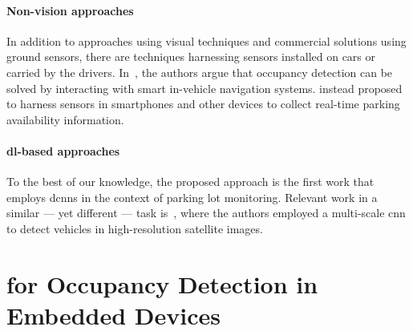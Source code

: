 \paragraph{Non-vision approaches}
In addition to approaches using visual techniques and commercial solutions using ground sensors, there are techniques harnessing sensors installed on cars or carried by the drivers.
In~\cite{caicedo2012prediction}, the authors argue that occupancy detection can be solved by interacting with smart in-vehicle navigation systems.
\citet{lan2014intelligent} instead proposed to harness sensors in smartphones and other devices to collect real-time parking availability information.
%
\paragraph{\gls{dl}-based approaches}
To the best of our knowledge, the proposed approach is the first work that employs \glspl{dcnn} in the context of parking lot monitoring.
Relevant work in a similar --- yet different --- task is~\cite{chen2014vehicle}, where the authors employed a multi-scale \gls{cnn} to detect vehicles in high-resolution satellite images.

\section{ for Occupancy Detection in Embedded Devices}
\label{sec:mini:occupancy-detection}

